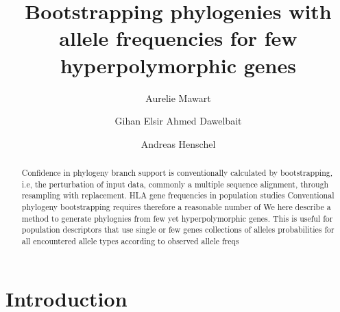 \documentclass{article}
\begin{document}
\title{Bootstrapping phylogenies with allele frequencies for few hyperpolymorphic genes}


\author{Aurelie Mawart}
 \author{Gihan Elsir Ahmed Dawelbait}
\author{Andreas Henschel}%



\begin{abstract}
    Confidence in phylogeny branch support is conventionally calculated by bootstrapping, i.e, the perturbation of input data, commonly a multiple sequence alignment, through resampling with replacement. HLA gene frequencies in population studies
    Conventional phylogeny bootstrapping requires therefore a reasonable number of 
    We here describe a method to generate phylognies from few yet hyperpolymorphic genes. 
    This is useful for population descriptors that use single or few genes collections of alleles
    probabilities for all encountered allele types according 
    to observed allele freqs
\end{abstract}

\maketitle

\section{Introduction}
\end{document}
